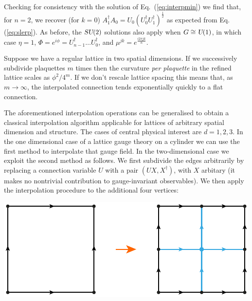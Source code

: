 \documentclass[twocolumn,lengthcheck,superscriptaddress]{revtex4-1}
\def\su2{\textsl{SU}(2)}
\def\uone{\textsl{U}(1)}
\theoremstyle{definition}
\theoremstyle{remark}
\begin{document}
Checking for consistency with the solution of Eq.~(\ref{eq:interpmin}) we find that, for $n=2$, we recover (for $k=0$) $A_1^\dag A_0 = U_0(U_0^\dag U_1^\dag)^{\frac{1}{2}}$ as expected from Eq. (\ref{eq:slerp}). As before, the $\su2$ solutions also apply when $G \cong \uone$, in which case $\eta = 1$, $\Phi = e^{i\phi} = U_{n-1}^\dag \dots U_0^\dag$, and $\mu^{jk} = e^{\frac{i2\pi jk}{n}}$. 

Suppose we have a regular lattice in two spatial dimensions. If we successively subdivide plaquettes $m$ times then the curvature \emph{per plaquette} in the refined lattice scales as $\phi^2/4^m$.  If we don't rescale lattice spacing this means that, as $m\rightarrow \infty$, the interpolated connection tends exponentially quickly to a flat connection.

The aforementioned interpolation operations can be generalised to obtain a classical interpolation algorithm applicable for lattices of arbitrary spatial dimension and structure. The cases of central physical interest are $d=1, 2, 3$. In the one dimensional case of a lattice gauge theory on a cylinder we can use the first method to interpolate that gauge field. In the two-dimensional case we exploit the second method as follows. We first subdivide the edges arbitrarily by replacing a connection variable $U$ with a pair $(UX, X^\dag)$, with $X$ arbitary (it makes no nontrivial contribution to gauge-invariant observables). We then apply the interpolation procedure to the additional four vertices:
\begin{center}
	\includegraphics{plaquettesubdivide.pdf}
\end{center}
\end{document}
